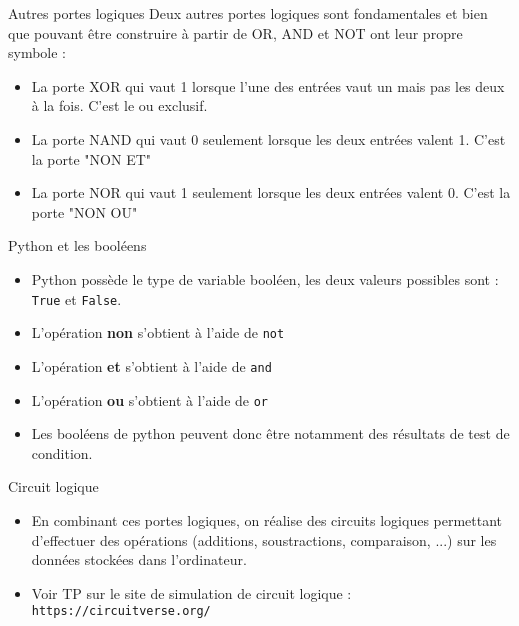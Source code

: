 \documentclass[10pt]{beamer}
\begin{document}
\begin{frame}
	\mframe{\Arch}
	\begin{block}{Autres portes logiques}
		Deux autres portes logiques sont fondamentales et bien que pouvant être construire à partir de OR, AND et NOT ont leur propre symbole :
		\begin{itemize}
			\item<2-> La porte XOR qui vaut 1 lorsque l'une des entrées vaut un mais pas les deux à la fois. C'est le ou exclusif.
			\item<3-> La porte NAND qui vaut 0 seulement lorsque les deux entrées valent 1. C'est la porte "NON ET"
			\item<4-> La porte NOR qui vaut 1 seulement lorsque les deux entrées valent 0. C'est la porte "NON OU"
		\end{itemize}
	\end{block}
\end{frame}


\begin{frame}
	\mframe{\Arch}
	\begin{block}{Python et les booléens}
		\begin{itemize}
			\item<1-> Python possède le type de variable booléen, les deux valeurs possibles sont : \texttt{True} et \texttt{False}.
			\item<2-> L'opération \textbf{non} s'obtient à l'aide de \texttt{not}
			\item<3-> L'opération \textbf{et} s'obtient à l'aide de \texttt{and}
			\item<4-> L'opération \textbf{ou} s'obtient à l'aide de \texttt{or}
			\item<5-> Les booléens de python peuvent donc être notamment des résultats de test de condition.
		\end{itemize}
	\end{block}
\end{frame}

\begin{frame}
	\mframe{\Arch}
	\begin{alertblock}{Circuit logique}
		\begin{itemize}
			\item<1-> En combinant ces portes logiques, on réalise des circuits logiques permettant d'effectuer des opérations (additions, soustractions, comparaison, ...) sur les données stockées dans l'ordinateur.
			\item<2-> Voir TP sur le site de simulation de circuit logique : {\tt https://circuitverse.org/}
		\end{itemize}
	\end{alertblock}
\end{frame}
\end{document}
